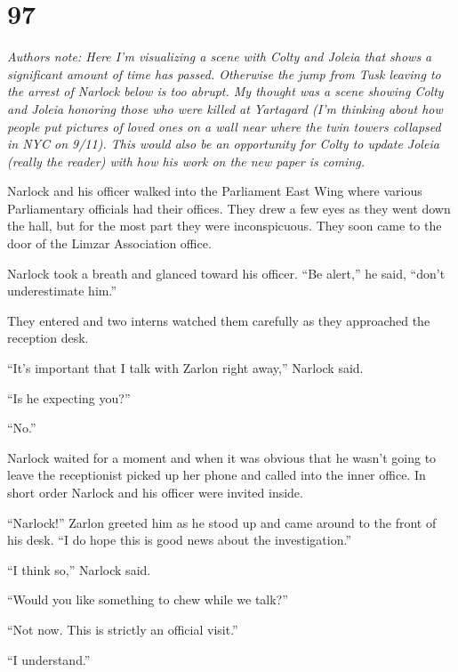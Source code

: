 
\chapter{97}

%
\textit{Authors note: Here I'm visualizing a scene with Colty and Joleia that shows a
  significant amount of time has passed. Otherwise the jump from Tusk leaving to the arrest of
  Narlock below is too abrupt. My thought was a scene showing Colty and Joleia honoring those
  who were killed at Yartagard (I'm thinking about how people put pictures of loved ones on a
  wall near where the twin towers collapsed in NYC on 9/11). This would also be an opportunity
  for Colty to update Joleia (really the reader) with how his work on the new paper is coming.}
  
\spacebreak

Narlock and his officer walked into the Parliament East Wing where various Parliamentary
officials had their offices. They drew a few eyes as they went down the hall, but for the most
part they were inconspicuous. They soon came to the door of the Limzar Association office.

Narlock took a breath and glanced toward his officer. ``Be alert,'' he said, ``don't
underestimate him.''

They entered and two interns watched them carefully as they approached the reception desk.

``It's important that I talk with Zarlon right away,'' Narlock said.

``Is he expecting you?''

``No.''

Narlock waited for a moment and when it was obvious that he wasn't going to leave the
receptionist picked up her phone and called into the inner office. In short order Narlock and
his officer were invited inside.

``Narlock!'' Zarlon greeted him as he stood up and came around to the front of his desk. ``I do
hope this is good news about the investigation.''

``I think so,'' Narlock said.

``Would you like something to chew while we talk?''

``Not now. This is strictly an official visit.''

``I understand.''


